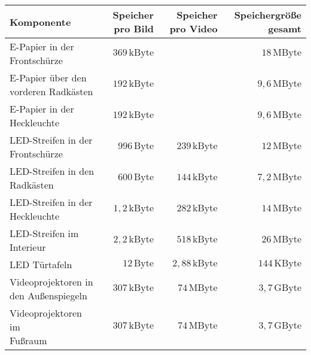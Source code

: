 \begin{table}[hbt]	
	\centering
	\renewcommand{\arraystretch}{1.5}	%
	\label{tab:Werte}
	\begin{tabular}{l|rrr}
		\textbf{Komponente} & \parbox[t]{0.18\linewidth}{\centering Speicher pro Bild} & \parbox[t]{0.18\linewidth}{\centering Speicher pro Video} &\parbox[t]{0.18\linewidth}{\centering Speichergröße gesamt} \\ 
		\hline 
		\hline 
		\parbox[t]{0.3\linewidth}{\RaggedRight E-Papier in der\\ Frontschürze} & $ 369\,\mathrm{kByte} $ && $ 18\,\mathrm{MByte} $  \\
		\parbox[t]{0.3\linewidth}{\RaggedRight E-Papier über den\\ vorderen Radkästen} & $ 192\,\mathrm{kByte} $ && $ 9,6\,\mathrm{MByte} $ \\
		\parbox[t]{0.3\linewidth}{\RaggedRight E-Papier in der\\ Heckleuchte} & $ 192\,\mathrm{kByte} $ && $ 9,6\,\mathrm{MByte} $ \\
		\parbox[t]{0.3\linewidth}{\RaggedRight LED-Streifen in der Frontschürze} & $ 996\,\mathrm{Byte} $ & $ 239\,\mathrm{kByte} $ & $ 12\,\mathrm{MByte} $ \\
		\parbox[t]{0.3\linewidth}{\RaggedRight LED-Streifen in den\\ Radkästen} & $ 600\,\mathrm{Byte} $ & $ 144\,\mathrm{kByte} $ & $ 7,2\,\mathrm{MByte} $ \\ 
		\parbox[t]{0.3\linewidth}{\RaggedRight LED-Streifen in der Heckleuchte} & $ 1,2\,\mathrm{kByte} $ & $ 282\,\mathrm{kByte} $ & $ 14\,\mathrm{MByte} $ \\ 
		\parbox[t]{0.3\linewidth}{\RaggedRight LED-Streifen im Interieur} & $ 2,2\,\mathrm{kByte} $ & $ 518\,\mathrm{kByte} $ &$ 26\,\mathrm{MByte} $ \\
		\parbox[t]{0.3\linewidth}{\RaggedRight LED Türtafeln} & $ 12\,\mathrm{Byte} $ & $ 2,88\,\mathrm{kByte} $ & $ 144\,\mathrm{KByte} $ \\
		\parbox[t]{0.3\linewidth}{\RaggedRight Videoprojektoren in\\den Außenspiegeln} & $ 307\,\mathrm{kByte} $ & $ 74\,\mathrm{MByte} $ & $ 3,7\,\mathrm{GByte} $ \\ 
		\parbox[t]{0.3\linewidth}{\RaggedRight Videoprojektoren im\\ Fußraum} & $ 307\,\mathrm{kByte} $ & $ 74\,\mathrm{MByte} $ &$ 3,7\,\mathrm{GByte} $ \\

\end{tabular}
\end{table}
